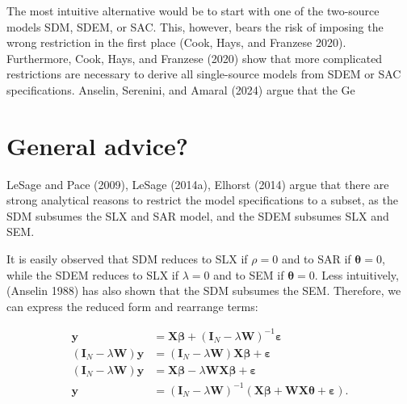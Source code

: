 \documentclass[
  letterpaper,
  DIV=11,
  numbers=noendperiod]{scrreprt}
\begin{document}
The most intuitive alternative would be to start with one of the
two-source models SDM, SDEM, or SAC. This, however, bears the risk of
imposing the wrong restriction in the first place (Cook, Hays, and
Franzese 2020). Furthermore, Cook, Hays, and Franzese (2020) show that
more complicated restrictions are necessary to derive all single-source
models from SDEM or SAC specifications. Anselin, Serenini, and Amaral
(2024) argue that the Ge

\hypertarget{general-advice}{%
\section{General advice?}\label{general-advice}}

LeSage and Pace (2009), LeSage (2014a), Elhorst (2014) argue that there
are strong analytical reasons to restrict the model specifications to a
subset, as the SDM subsumes the SLX and SAR model, and the SDEM subsumes
SLX and SEM.

It is easily observed that SDM reduces to SLX if \(\rho=0\) and to SAR
if \({\boldsymbol{\mathbf{\theta}}}=0\), while the SDEM reduces to SLX
if \(\lambda=0\) and to SEM if \({\boldsymbol{\mathbf{\theta}}}=0\).
Less intuitively, (Anselin 1988) has also shown that the SDM subsumes
the SEM. Therefore, we can express the reduced form and rearrange terms:

\[
\begin{split}
{\boldsymbol{\mathbf{y}}}&= {\boldsymbol{\mathbf{X}}}{\boldsymbol{\mathbf{\beta}}} + ({\boldsymbol{\mathbf{I}}_N}-\lambda {\boldsymbol{\mathbf{W}}})^{-1}{\boldsymbol{\mathbf{\varepsilon}}} \\
({\boldsymbol{\mathbf{I}}_N}-\lambda {\boldsymbol{\mathbf{W}}}){\boldsymbol{\mathbf{y}}}&= ({\boldsymbol{\mathbf{I}}_N}-\lambda {\boldsymbol{\mathbf{W}}}){\boldsymbol{\mathbf{X}}}{\boldsymbol{\mathbf{\beta}}} + {\boldsymbol{\mathbf{\varepsilon}}} \\
({\boldsymbol{\mathbf{I}}_N}-\lambda {\boldsymbol{\mathbf{W}}}){\boldsymbol{\mathbf{y}}}&={\boldsymbol{\mathbf{X}}}{\boldsymbol{\mathbf{\beta}}} -\lambda{\boldsymbol{\mathbf{W}}}{\boldsymbol{\mathbf{X}}}{\boldsymbol{\mathbf{\beta}}} + {\boldsymbol{\mathbf{\varepsilon}}} \\
{\boldsymbol{\mathbf{y}}}&=({\boldsymbol{\mathbf{I}}_N}-\lambda {\boldsymbol{\mathbf{W}}})^{-1}({\boldsymbol{\mathbf{X}}}{\boldsymbol{\mathbf{\beta}}} + {\boldsymbol{\mathbf{W}}}{\boldsymbol{\mathbf{X}}}{\boldsymbol{\mathbf{\theta}}} + {\boldsymbol{\mathbf{\varepsilon}}}). 
\end{split}
\]
\end{document}
